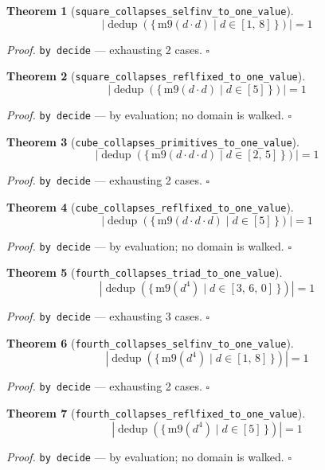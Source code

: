 \documentclass[11pt]{article}
\newtheorem{theorem}{Theorem}[section]
\begin{document}
\begin{theorem}[\texttt{square\_collapses\_selfinv\_to\_one\_value}]
\[ \left|\operatorname{dedup}\left(\{\, \mathrm{m9}\mathopen{}\left(d \cdot d\right) \mid d \in [1,\,8] \,\}\right)\right| = 1 \]
\end{theorem}
\noindent\emph{Proof.} \texttt{by decide} --- exhausting 2 cases. \hfill$\square$

\begin{theorem}[\texttt{square\_collapses\_reflfixed\_to\_one\_value}]
\[ \left|\operatorname{dedup}\left(\{\, \mathrm{m9}\mathopen{}\left(d \cdot d\right) \mid d \in [5] \,\}\right)\right| = 1 \]
\end{theorem}
\noindent\emph{Proof.} \texttt{by decide} --- by evaluation; no domain is walked. \hfill$\square$

\begin{theorem}[\texttt{cube\_collapses\_primitives\_to\_one\_value}]
\[ \left|\operatorname{dedup}\left(\{\, \mathrm{m9}\mathopen{}\left(d \cdot d \cdot d\right) \mid d \in [2,\,5] \,\}\right)\right| = 1 \]
\end{theorem}
\noindent\emph{Proof.} \texttt{by decide} --- exhausting 2 cases. \hfill$\square$

\begin{theorem}[\texttt{cube\_collapses\_reflfixed\_to\_one\_value}]
\[ \left|\operatorname{dedup}\left(\{\, \mathrm{m9}\mathopen{}\left(d \cdot d \cdot d\right) \mid d \in [5] \,\}\right)\right| = 1 \]
\end{theorem}
\noindent\emph{Proof.} \texttt{by decide} --- by evaluation; no domain is walked. \hfill$\square$

\begin{theorem}[\texttt{fourth\_collapses\_triad\_to\_one\_value}]
\[ \left|\operatorname{dedup}\left(\{\, \mathrm{m9}\mathopen{}\left(d^{4}\right) \mid d \in [3,\,6,\,0] \,\}\right)\right| = 1 \]
\end{theorem}
\noindent\emph{Proof.} \texttt{by decide} --- exhausting 3 cases. \hfill$\square$

\begin{theorem}[\texttt{fourth\_collapses\_selfinv\_to\_one\_value}]
\[ \left|\operatorname{dedup}\left(\{\, \mathrm{m9}\mathopen{}\left(d^{4}\right) \mid d \in [1,\,8] \,\}\right)\right| = 1 \]
\end{theorem}
\noindent\emph{Proof.} \texttt{by decide} --- exhausting 2 cases. \hfill$\square$

\begin{theorem}[\texttt{fourth\_collapses\_reflfixed\_to\_one\_value}]
\[ \left|\operatorname{dedup}\left(\{\, \mathrm{m9}\mathopen{}\left(d^{4}\right) \mid d \in [5] \,\}\right)\right| = 1 \]
\end{theorem}
\noindent\emph{Proof.} \texttt{by decide} --- by evaluation; no domain is walked. \hfill$\square$
\end{document}
